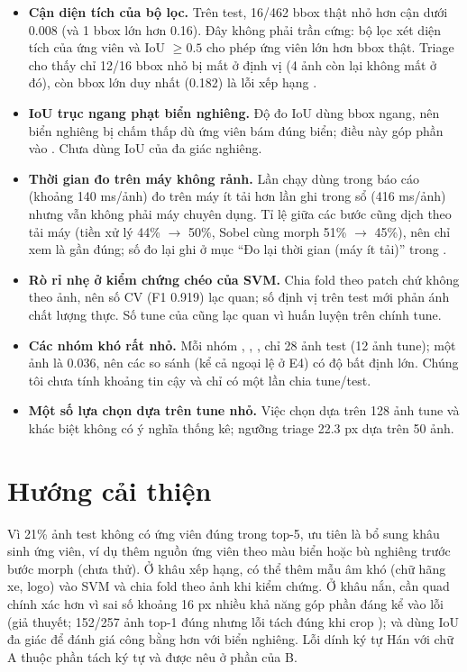 \begin{itemize}
  \item \textbf{Cận diện tích của bộ lọc.} Trên test, 16/462 bbox thật nhỏ hơn cận dưới  0.008 (và 1 bbox lớn hơn 0.16). Đây không phải trần cứng: bộ lọc xét diện tích  của ứng viên và IoU $\ge 0.5$ cho phép ứng viên lớn hơn bbox thật. Triage cho thấy chỉ 12/16 bbox nhỏ bị mất ở định vị (4 ảnh còn lại không mất ở đó), còn bbox lớn duy nhất (0.182) là lỗi xếp hạng .
  \item \textbf{IoU trục ngang phạt biển nghiêng.} Độ đo IoU dùng bbox ngang, nên biển nghiêng bị chấm thấp dù ứng viên bám đúng biển; điều này góp phần vào . Chưa dùng IoU của đa giác nghiêng.
  \item \textbf{Thời gian đo trên máy không rảnh.} Lần chạy dùng trong báo cáo (khoảng 140 ms/ảnh) đo trên máy ít tải hơn lần ghi trong sổ (416 ms/ảnh) nhưng vẫn không phải máy chuyên dụng. Tỉ lệ giữa các bước cũng dịch theo tải máy (tiền xử lý 44\% $\to$ 50\%, Sobel cùng morph 51\% $\to$ 45\%), nên chỉ xem là gần đúng; số đo lại ghi ở mục ``Đo lại thời gian (máy ít tải)'' trong .
  \item \textbf{Rò rỉ nhẹ ở kiểm chứng chéo của SVM.} Chia fold theo patch chứ không theo ảnh, nên số CV (F1 0.919) lạc quan; số định vị trên test mới phản ánh chất lượng thực. Số tune của  cũng lạc quan vì huấn luyện trên chính tune.
  \item \textbf{Các nhóm khó rất nhỏ.} Mỗi nhóm , , ,  chỉ 28 ảnh test (12 ảnh tune); một ảnh là 0.036, nên các so sánh (kể cả ngoại lệ  ở E4) có độ bất định lớn. Chúng tôi chưa tính khoảng tin cậy và chỉ có một lần chia tune/test.
  \item \textbf{Một số lựa chọn dựa trên tune nhỏ.} Việc chọn  dựa trên 128 ảnh tune và khác biệt không có ý nghĩa thống kê; ngưỡng triage 22.3 px dựa trên 50 ảnh.
\end{itemize}

\section{Hướng cải thiện}

Vì 21\% ảnh test không có ứng viên đúng trong top-5, ưu tiên là bổ sung khâu sinh ứng viên, ví dụ thêm nguồn ứng viên theo màu biển hoặc bù nghiêng trước bước morph (chưa thử). Ở khâu xếp hạng, có thể thêm mẫu âm khó (chữ hãng xe, logo) vào SVM và chia fold theo ảnh khi kiểm chứng. Ở khâu nắn, cần quad chính xác hơn vì sai số khoảng 16 px nhiều khả năng góp phần đáng kể vào lỗi (giả thuyết; 152/257 ảnh top-1 đúng nhưng lỗi tách đúng khi crop ); và dùng IoU đa giác để đánh giá công bằng hơn với biển nghiêng. Lỗi dính ký tự Hán với chữ A thuộc phần tách ký tự và được nêu ở phần của B.
